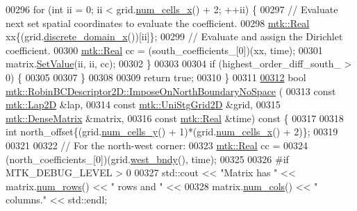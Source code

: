 \begin{DoxyCode}
00296   \textcolor{keywordflow}{for} (\textcolor{keywordtype}{int} ii = 0; ii < grid.\hyperlink{classmtk_1_1UniStgGrid2D_a2d182866a398aba8e4829590e85bf939}{num\_cells\_x}() + 2; ++ii) \{
00297     \textcolor{comment}{// Evaluate next set spatial coordinates to evaluate the coefficient.}
00298     \hyperlink{group__c01-roots_gac080bbbf5cbb5502c9f00405f894857d}{mtk::Real} xx\{(grid.\hyperlink{classmtk_1_1UniStgGrid2D_ab2f70cf5cd0a2d5486992d9f2f8baa4a}{discrete\_domain\_x}())[ii]\};
00299     \textcolor{comment}{// Evaluate and assign the Dirichlet coefficient.}
00300     \hyperlink{group__c01-roots_gac080bbbf5cbb5502c9f00405f894857d}{mtk::Real} cc = (south\_coefficients\_[0])(xx, time);
00301     matrix.\hyperlink{classmtk_1_1DenseMatrix_a784ce5784109ac86bfb9d8562b334b13}{SetValue}(ii, ii, cc);
00302   \}
00303 
00304   \textcolor{keywordflow}{if} (highest\_order\_diff\_south\_ > 0) \{
00305 
00307   \}
00308 
00309   \textcolor{keywordflow}{return} \textcolor{keyword}{true};
00310 \}
00311 
\hypertarget{mtk__robin__bc__descriptor__2d_8cc_source_l00312}{}\hyperlink{classmtk_1_1RobinBCDescriptor2D_a3bc22c1d5a7a4d7c2130351cbfa35135}{00312} \textcolor{keywordtype}{bool} \hyperlink{classmtk_1_1RobinBCDescriptor2D_a3bc22c1d5a7a4d7c2130351cbfa35135}{mtk::RobinBCDescriptor2D::ImposeOnNorthBoundaryNoSpace}
      (
00313     \textcolor{keyword}{const} \hyperlink{classmtk_1_1Lap2D}{mtk::Lap2D} &lap,
00314     \textcolor{keyword}{const} \hyperlink{classmtk_1_1UniStgGrid2D}{mtk::UniStgGrid2D} &grid,
00315     \hyperlink{classmtk_1_1DenseMatrix}{mtk::DenseMatrix} &matrix,
00316     \textcolor{keyword}{const} \hyperlink{group__c01-roots_gac080bbbf5cbb5502c9f00405f894857d}{mtk::Real} &time)\textcolor{keyword}{ const }\{
00317 
00318   \textcolor{keywordtype}{int} north\_offset\{(grid.\hyperlink{classmtk_1_1UniStgGrid2D_aed05a801cc9a76dba0ff203cea58a61a}{num\_cells\_y}() + 1)*(grid.\hyperlink{classmtk_1_1UniStgGrid2D_a2d182866a398aba8e4829590e85bf939}{num\_cells\_x}() + 2)\};
00319 
00321 
00322   \textcolor{comment}{// For the north-west corner:}
00323   \hyperlink{group__c01-roots_gac080bbbf5cbb5502c9f00405f894857d}{mtk::Real} cc =
00324     (north\_coefficients\_[0])(grid.\hyperlink{classmtk_1_1UniStgGrid2D_af2b1712387ded85edaf2b64617d3fc13}{west\_bndy}(), time);
00325 
00326 \textcolor{preprocessor}{  #if MTK\_DEBUG\_LEVEL > 0}
00327   std::cout << \textcolor{stringliteral}{"Matrix has "} << matrix.\hyperlink{classmtk_1_1DenseMatrix_a53f3afb3b6a8d21854458aaa9663cc74}{num\_rows}() << \textcolor{stringliteral}{" rows and "} <<
00328     matrix.\hyperlink{classmtk_1_1DenseMatrix_a41747502d468c6728a4be31501b16e0e}{num\_cols}() << \textcolor{stringliteral}{" columns."} << std::endl;

\end{DoxyCode}
